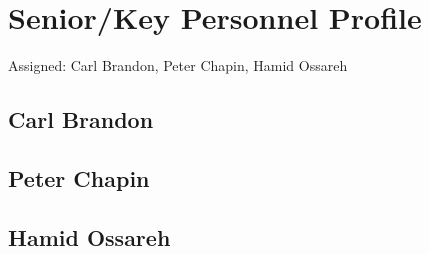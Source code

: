 \section{Senior/Key Personnel Profile}
Assigned: Carl Brandon, Peter Chapin, Hamid Ossareh
\subsection{Carl Brandon}
\subsection{Peter Chapin}
\subsection{Hamid Ossareh}
